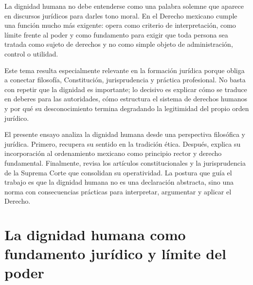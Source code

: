 \documentclass[
	spanish,
	letterpaper, oneside
]{article}
\begin{document}
La dignidad humana no debe entenderse como una palabra solemne que aparece en discursos jurídicos para darles tono moral. En el Derecho mexicano cumple una función mucho más exigente: opera como criterio de interpretación, como límite frente al poder y como fundamento para exigir que toda persona sea tratada como sujeto de derechos y no como simple objeto de administración, control o utilidad.

Este tema resulta especialmente relevante en la formación jurídica porque obliga a conectar filosofía, Constitución, jurisprudencia y práctica profesional. No basta con repetir que la dignidad es importante; lo decisivo es explicar cómo se traduce en deberes para las autoridades, cómo estructura el sistema de derechos humanos y por qué su desconocimiento termina degradando la legitimidad del propio orden jurídico.

El presente ensayo analiza la dignidad humana desde una perspectiva filosófica y jurídica. Primero, recupera su sentido en la tradición ética. Después, explica su incorporación al ordenamiento mexicano como principio rector y derecho fundamental. Finalmente, revisa los artículos constitucionales y la jurisprudencia de la Suprema Corte que consolidan su operatividad. La postura que guía el trabajo es que la dignidad humana no es una declaración abstracta, sino una norma con consecuencias prácticas para interpretar, argumentar y aplicar el Derecho.

%
\section{La dignidad humana como fundamento jurídico y límite del poder}
\end{document}
